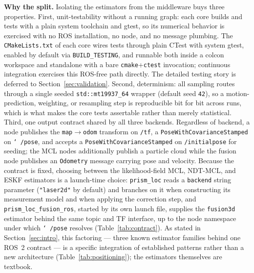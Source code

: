 \textbf{Why the split.} Isolating the estimators from the middleware
buys three properties. First, unit-testability without a running
graph: each core builds and tests with a plain system toolchain and
gtest, so its numerical behavior is exercised with no ROS installation,
no node, and no message plumbing. The \texttt{CMakeLists.txt} of each
core wires tests through plain CTest with system gtest, enabled by
default via \texttt{BUILD\_TESTING}, and runnable both inside a colcon
workspace and standalone with a bare
\texttt{cmake}+\texttt{ctest} invocation; continuous integration
exercises this ROS-free path directly. The detailed
testing story is deferred to Section~\ref{sec:validation}. Second,
determinism: all sampling routes through a single seeded
\texttt{std::mt19937\_64} wrapper (default seed \texttt{42}), so a
motion-prediction, weighting, or resampling step is reproducible bit
for bit across runs, which is what makes the core tests assertable
rather than merely statistical. Third, one output contract shared by
all three backends. Regardless of backend, a node publishes the
\texttt{map}$\rightarrow$\texttt{odom} transform on \texttt{/tf}, a
\texttt{PoseWithCovarianceStamped} on \texttt{\char`~/pose}, and
accepts a \texttt{PoseWithCovarianceStamped} on \texttt{/initialpose}
for seeding; the MCL nodes additionally publish a particle cloud while
the fusion node publishes an \texttt{Odometry} message carrying pose
and velocity. Because the contract is fixed, choosing between the
likelihood-field MCL, NDT-MCL, and ESKF estimators is a launch-time
choice: \texttt{prism\_loc} reads a \texttt{backend} string parameter
(\texttt{"laser2d"} by default) and branches on it when constructing
its measurement model and when applying the correction step, and
\texttt{prism\_loc\_fusion\_ros}, started by its own launch file,
supplies the \texttt{fusion3d} estimator behind the same topic and TF
interface, up to the node namespace under which
\texttt{\char`~/pose} resolves (Table~\ref{tab:contract}). As stated in
Section~\ref{sec:intro}, this factoring --- three known estimator
families behind one ROS~2 contract --- is a specific integration of
established patterns rather than a new architecture
(Table~\ref{tab:positioning}); the estimators themselves are textbook.


